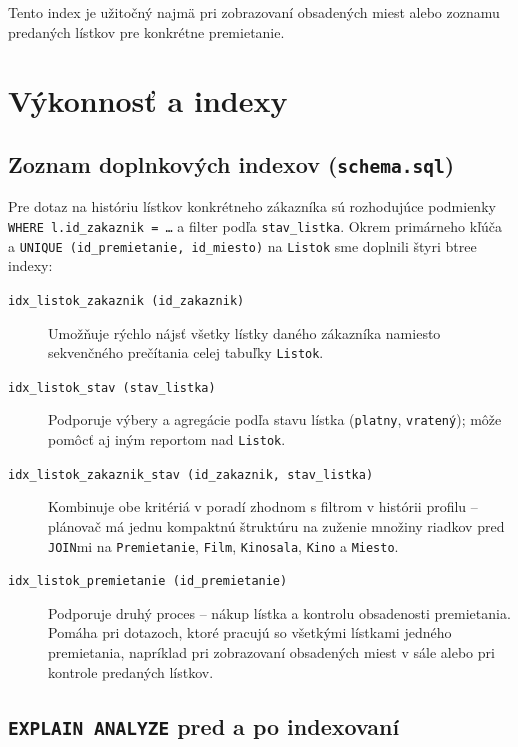 \documentclass[11pt, a4paper]{article}
\begin{document}
Tento index je užitočný najmä pri zobrazovaní obsadených miest alebo zoznamu predaných lístkov pre konkrétne premietanie.

\section{Výkonnosť a indexy}
\label{sec:vykonnost-indexy}

\subsection{Zoznam doplnkových indexov (\texttt{schema.sql})}

Pre dotaz na históriu lístkov konkrétneho zákazníka sú rozhodujúce podmienky \texttt{WHERE l.id\_zakaznik = \ldots} a filter podľa \texttt{stav\_listka}.
Okrem primárneho kľúča a \texttt{UNIQUE (id\_premietanie, id\_miesto)} na \texttt{Listok} sme doplnili štyri btree indexy:

\begin{description}
    \item[\texttt{idx\_listok\_zakaznik (id\_zakaznik)}]
        Umožňuje rýchlo nájsť všetky lístky daného zákazníka namiesto sekvenčného prečítania celej tabuľky \texttt{Listok}.

    \item[\texttt{idx\_listok\_stav (stav\_listka)}]
        Podporuje výbery a agregácie podľa stavu lístka (\texttt{platny}, \texttt{vratený}); môže pomôcť aj iným reportom nad \texttt{Listok}.

    \item[\texttt{idx\_listok\_zakaznik\_stav (id\_zakaznik, stav\_listka)}]
        Kombinuje obe kritériá v poradí zhodnom s filtrom v histórii profilu -- plánovač má jednu kompaktnú štruktúru na zuženie množiny riadkov pred \texttt{JOIN}mi na \texttt{Premietanie}, \texttt{Film}, \texttt{Kinosala}, \texttt{Kino} a \texttt{Miesto}.
    \item[\texttt{idx\_listok\_premietanie (id\_premietanie)}]
        Podporuje druhý proces -- nákup lístka a kontrolu obsadenosti premietania. Pomáha pri dotazoch, ktoré pracujú so všetkými lístkami jedného premietania, napríklad pri zobrazovaní obsadených miest v sále alebo pri kontrole predaných lístkov.
    \end{description}

\subsection{\texttt{EXPLAIN ANALYZE} pred a po indexovaní}
\end{document}
